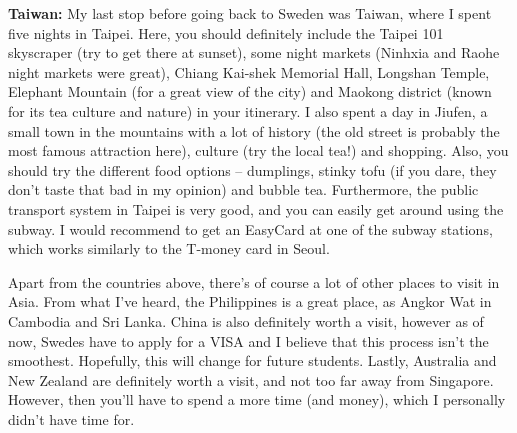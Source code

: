 \textbf{Taiwan:} My last stop before going back to Sweden was Taiwan, where I spent five nights in Taipei. 
Here, you should definitely include the Taipei 101 skyscraper (try to get there at sunset), some night markets (Ninhxia and Raohe night markets were great), Chiang Kai-shek Memorial Hall, Longshan Temple, Elephant Mountain (for a great view of the city) and Maokong district (known for its tea culture and nature) in your itinerary. I also spent a day in Jiufen, a small town in the mountains with a lot of history (the old street is probably the most famous attraction here), culture (try the local tea!) and shopping. Also, you should try the different food options -- dumplings, stinky tofu (if you dare, they don't taste that bad in my opinion) and bubble tea. Furthermore, the public transport system in Taipei is very good, and you can easily get around using the subway. I would recommend to get an EasyCard at one of the subway stations, which works similarly to the T-money card in Seoul.

\hrulefill

Apart from the countries above, there's of course a lot of other places to visit in Asia. From what I've heard, the Philippines is a great place, as Angkor Wat in Cambodia and Sri Lanka. China is also definitely worth a visit, however as of now, Swedes have to apply for a VISA and I believe that this process isn't the smoothest. Hopefully, this will change for future students. Lastly, Australia and New Zealand are definitely worth a visit, and not too far away from Singapore. However, then you'll have to spend a more time (and money), which I personally didn't have time for.